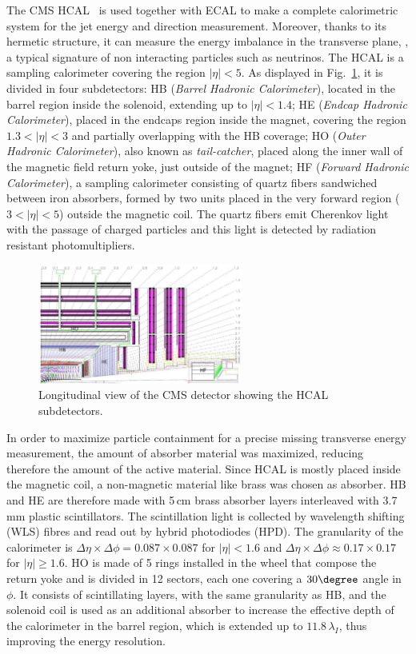 The CMS HCAL~\cite{hcal} is used together with ECAL to make a complete calorimetric system for the jet energy and direction measurement. Moreover, thanks to its hermetic structure, it can measure the energy imbalance in the transverse plane, \MET, a typical signature of non interacting particles such as neutrinos. The HCAL is a sampling calorimeter covering the region $|\eta|<5$. As displayed in Fig.~\ref{fig:hcal}, it is divided in four subdetectors: HB (\emph{Barrel Hadronic Calorimeter}), located in the barrel region inside the solenoid, extending up to $|\eta|<1.4$; HE (\emph{Endcap Hadronic Calorimeter}), placed in the endcaps region inside the magnet, covering the region $1.3 < |\eta| < 3$ and partially overlapping with the HB coverage; HO (\emph{Outer Hadronic Calorimeter}), also known as \emph{tail-catcher}, placed along the inner wall of the magnetic field return yoke, just outside of the magnet; HF (\emph{Forward Hadronic Calorimeter}), a sampling calorimeter consisting of quartz fibers sandwiched between iron absorbers,
formed by two units placed in the very forward region ($3<|\eta|<5$) outside the magnetic coil. The quartz fibers emit Cherenkov light with the passage of charged particles and this light is detected by radiation resistant photomultipliers.
\begin{figure}[htb]
\centering
\includegraphics[width=0.6\textwidth]{images/hcal.png}
\caption{Longitudinal view of the CMS detector showing the HCAL subdetectors.}\label{fig:hcal}
\end{figure}
In order to maximize particle containment for a precise missing transverse energy measurement, the amount of absorber material was maximized, reducing therefore the amount of the active material. Since HCAL is mostly placed inside the magnetic coil, a non-magnetic material like brass was chosen as absorber. HB and HE are therefore made with 5\,cm brass absorber layers interleaved with 3.7\,mm plastic scintillators. The scintillation light is collected by wavelength shifting (WLS) fibres and read out by hybrid photodiodes (HPD). The granularity of the calorimeter is $\Delta\eta\times\Delta\phi = 0.087 \times 0.087$ for $|\eta|<1.6$ and $\Delta\eta\times\Delta\phi \approx 0.17 \times 0.17$ for $|\eta|\geq1.6$. HO is made of 5 rings installed in the wheel that compose the return yoke and is divided in 12 sectors, each one covering a $30\degree$ angle in $\phi$. It consists of scintillating layers, with the same granularity as HB, and the solenoid coil is used as an additional absorber to increase the effective depth of the calorimeter in the barrel region, which is extended up to $11.8\,\lambda_I$, thus improving the energy resolution.

